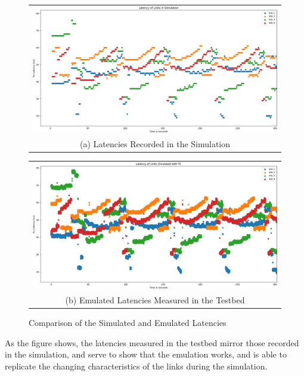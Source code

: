 \begin{figure}
  \centering
  \begin{tabular}{@{}c@{}}
    \includegraphics[width=\linewidth]{fig/simulated_latencies.png} \\[\abovecaptionskip]
    \small (a) Latencies Recorded in the Simulation
  \end{tabular}

  \vspace{\floatsep}

  \begin{tabular}{@{}c@{}}
    \includegraphics[width=\linewidth]{fig/emulated_latencies.png} \\[\abovecaptionskip]
    \small (b) Emulated Latencies Measured in the Testbed
  \end{tabular}

  \caption{Comparison of the Simulated and Emulated Latencies}\label{fig:sim_vs_em}
\end{figure}


As the figure shows,  the latencies measured in the testbed mirror those recorded in the simulation, and serve to show that the emulation works, and is able to replicate the changing characteristics of the links during the simulation.

